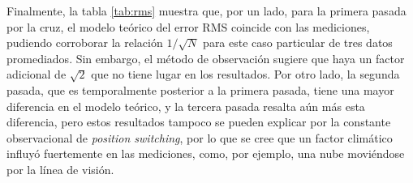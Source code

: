 Finalmente, la tabla \ref{tab:rms} muestra que, por un lado, para la primera pasada por la cruz, el modelo teórico del error RMS coincide con las mediciones, pudiendo corroborar la relación $1/\sqrt{N}$ para este caso particular de tres datos promediados. Sin embargo, el método de observación sugiere que haya un factor adicional de $\sqrt{2}$ que no tiene lugar en los resultados. Por otro lado, la segunda pasada, que es temporalmente posterior a la primera pasada, tiene una mayor diferencia en el modelo teórico, y la tercera pasada resalta aún más esta diferencia, pero estos resultados tampoco se pueden explicar por la constante observacional de \textit{position switching}, por lo que se cree que un factor climático influyó fuertemente en las mediciones, como, por ejemplo, una nube moviéndose por la línea de visión.
